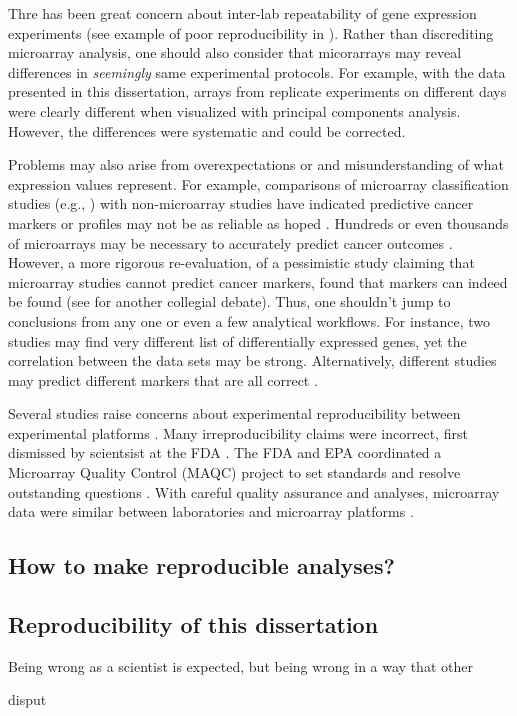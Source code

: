 Thre has been great concern about inter-lab repeatability of 
gene expression experiments
(see example of poor reproducibility in 
\cite{Evsikov:2003ic,Fortunel:2003eu,Ivanova:2003bh,RamalhoSantos:2002dy}). 
Rather than discrediting microarray analysis,
one should also consider that micorarrays
may reveal differences in \textit{seemingly} same experimental protocols.
For example, with the data presented in this dissertation, arrays from
replicate experiments on different days were clearly different when
visualized with principal components analysis. However, the differences
were systematic and could be corrected.

Problems may also arise from overexpectations or and misunderstanding 
of what expression values represent. 
For example, comparisons of microarray classification
studies (e.g., \cite{Veer:2002vv,Yeoh:2002wg,Alizadeh:2000tn,Golub:1999fn,
Perou:1999fr,Wang:2005uu,VanDeVijver:2002wj,Rosenwald:2002eg,Beer:2002uy,
Bhattacharjee:2001dt,Ramaswamy:2003to,Pomeroy:2002wx,Iizuka:2003wo})
with non-microarray studies have indicated predictive cancer markers or profiles
may not be as reliable as hoped \cite{Miklos:2004wn,Michiels:2007vs,Koscielny:2010gg,Eden:2004ua}.
Hundreds or even thousands of microarrays may be necessary to
accurately predict cancer 
outcomes \cite{Ioannidis:2005kd,Michiels:2005tg,EinDor:2006ga,Frantz:2005ur}.
However, a more rigorous re-evaluation, of a pessimistic study claiming
that microarray studies cannot predict cancer markers, found that
markers can indeed be found (see \cite{Michiels:2005tg,Fan:2010cv,Tong:2010ka,Koscielny:2010jd}
for another collegial debate).
Thus, one shouldn't jump to conclusions from any one or even a few
analytical workflows.
For instance, two studies may find very different
list of differentially expressed genes, yet the correlation
between the data sets may be strong. Alternatively, different studies may
predict different markers that are all correct \cite{Zhang:2008bk,Zhang:2009cy}.

Several studies 
raise concerns about experimental reproducibility between
experimental platforms \cite{Tan:2003be,Kuo:2002cl,
Mah:2004ia,Rogojina:2003te,Woo:2004wz,Li:2002cz,Kothapalli:2002gz}.
Many irreproducibility claims were incorrect, first
dismissed by scientsist at the FDA \cite{Shi:2005ik}.
The FDA and EPA coordinated a Microarray Quality Control (MAQC) project
to set standards and resolve outstanding questions 
\cite{Lesko:2004vi,Frueh:2006uy,Dix:2006ty,Shi:2004vh}.
With careful quality assurance and analyses,
microarray data were similar between 
laboratories \cite{Dobbin:2005wj,Irizarry:2005kb,Larkin:2005hb,
Ulrich:2004vw,Waring:2004vh,Weis:2005ut} and
microarray platforms \cite{Petersen:2005by,Yauk:2004fq,
Park:2004ux,Yuen:2002ha,Canales:2006ts,Shippy:2006uf,
Patterson:2006hi,Tong:2006cg,Guo:2006wi}.

\subsection{How to make reproducible analyses?}

\subsection{Reproducibility of this dissertation}

Being wrong as a scientist is expected, but being wrong in a way
that other


disput




